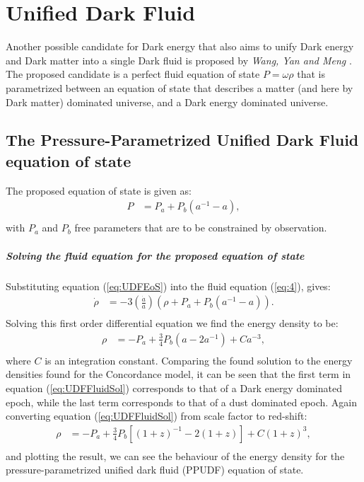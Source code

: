 \documentclass[a4paper, 11pt]{FSKH_623_Report}
\numberwithin{equation}{section}
\newcommand{\brac}[1]{\left(#1\right)}
\newcommand{\bracc}[1]{\left[#1\right]}
\begin{document}
\chapter{Unified Dark Fluid}
Another possible candidate for Dark energy that also aims to unify Dark energy and Dark matter into a single Dark fluid is proposed by \textit{Wang, Yan and Meng} \citep{wang2017new}. The proposed candidate is a perfect fluid equation of state $P=\omega\rho$ that is parametrized between an equation of state that describes a matter (and here by Dark matter) dominated universe, and a Dark energy dominated universe. 
\section{The Pressure-Parametrized Unified Dark Fluid equation of state}
The proposed equation of state is given as:
\begin{equation}\label{eq:UDFEoS}
\begin{split}
P &= P_{a}+P_{b}\brac{a^{-1}-a},         \\
\end{split}
\end{equation}
with $P_{a}$ and $P_{b}$ free parameters that are to be constrained by observation.
\paragraph{Solving the fluid equation for the proposed equation of state}
Substituting equation (\ref{eq:UDFEoS}) into the fluid equation (\ref{eq:4}), gives:
\begin{equation}\label{eq:UDFFluid}
\begin{split}
\dot{\rho} &= -3\brac{\frac{\dot{a}}{a}}\brac{\rho+P_{a}+P_{b}\brac{a^{-1}-a}}. \\
\end{split}
\end{equation}
Solving this first order differential equation we find the energy density to be:\begin{equation}\label{eq:UDFFluidSol}
\begin{split}
\rho&= -P_{a}+\frac{3}{4}P_{b}\brac{a-2a^{-1}}+Ca^{-3}, \\
\end{split}
\end{equation}
where $C$ is an integration constant. Comparing the found solution to the energy densities found for the Concordance model, it can be seen that the first term in equation (\ref{eq:UDFFluidSol}) corresponds to that of a Dark energy dominated epoch, while the last term corresponds to that of a dust dominated epoch.
Again converting equation (\ref{eq:UDFFluidSol}) from scale factor to red-shift:
\begin{equation}\label{eq:UDFFluidSolZ}
\begin{split}
\rho&= -P_{a}+\frac{3}{4}P_{b}\bracc{\brac{1+z}^{-1}-2\brac{1+z}}+C\brac{1+z}^{3}, \\
\end{split}
\end{equation}
and plotting the result, we can see the behaviour of the energy density for the pressure-parametrized unified dark fluid (PPUDF) equation of state.
\end{document}
